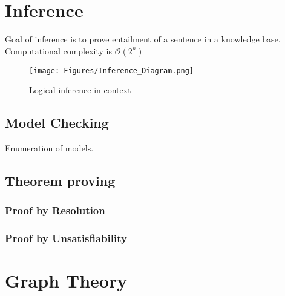 \section{Inference}
Goal of inference is to prove entailment of a sentence in a knowledge base. Computational complexity is $\mathcal{O}(2^n)$

\begin{figure}[H]
    \centering
    \texttt{[image: Figures/Inference\_Diagram.png]}
    \caption{Logical inference in context}
    \label{fig:entailment}
\end{figure}




\subsection{Model Checking}
Enumeration of models.
\subsection{Theorem proving}
\subsubsection{Proof by Resolution}
\subsubsection{Proof by Unsatisfiability}












\section{Graph Theory}









